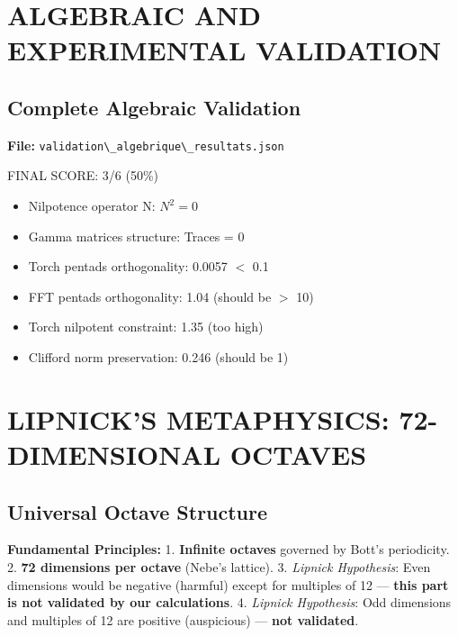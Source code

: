 \documentclass[11pt]{article}
\providecommand{\cmark}{\ding{51}}
\providecommand{\xmark}{\ding{55}}
\newcommand{\symSucces}{\textcolor{success}{\cmark}}
\newcommand{\symEchec}{\textcolor{failure}{\xmark}}
\newcommand{\passthrough}[1]{#1}
\begin{document}
\hypertarget{algebraic-and-experimental-validation}{%
\section{ALGEBRAIC AND EXPERIMENTAL
VALIDATION}\label{algebraic-and-experimental-validation}}

\hypertarget{complete-algebraic-validation}{%
\subsection{Complete Algebraic
Validation}\label{complete-algebraic-validation}}

\textbf{File:}
\passthrough{\lstinline!validation\_algebrique\_resultats.json!}

\begin{validationbox}{FINAL SCORE: 3/6 (50\%)}
\begin{itemize}
    \item[\symSucces] Nilpotence operator N: $N^2 = 0$
    \item[\symSucces] Gamma matrices structure: Traces = 0
    \item[\symSucces] Torch pentads orthogonality: 0.0057 $<$ 0.1
    \item[\symEchec] FFT pentads orthogonality: 1.04 (should be $>$ 10)
    \item[\symEchec] Torch nilpotent constraint: 1.35 (too high)
    \item[\symEchec] Clifford norm preservation: 0.246 (should be 1)
\end{itemize}
\end{validationbox}

\hypertarget{lipnicks-metaphysics-72-dimensional-octaves}{%
\section{LIPNICK'S METAPHYSICS: 72-DIMENSIONAL
OCTAVES}\label{lipnicks-metaphysics-72-dimensional-octaves}}

\hypertarget{universal-octave-structure}{%
\subsection{Universal Octave
Structure}\label{universal-octave-structure}}

\textbf{Fundamental Principles:} 1. \textbf{Infinite octaves} governed
by Bott's periodicity. 2. \textbf{72 dimensions per octave} (Nebe's
lattice). 3. \emph{Lipnick Hypothesis}: Even dimensions would be
negative (harmful) except for multiples of 12 --- \textbf{this part is
not validated by our calculations}. 4. \emph{Lipnick Hypothesis}: Odd
dimensions and multiples of 12 are positive (auspicious) --- \textbf{not
validated}.
\end{document}
